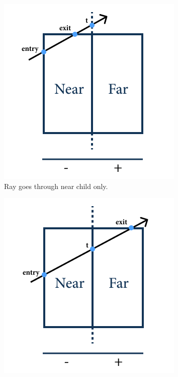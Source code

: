 \documentclass[a4paper,11pt,oneside]{article}
\begin{document}
\begin{figure}[ht]
     \centering
     \begin{subfigure}[b]{0.3\textwidth}
         \centering
         \includegraphics[width=\textwidth]{section4/4.3/near-intersection.png}
         \caption{Ray goes through near child only.}
         \label{sec4.3:near-child}
     \end{subfigure}
     \hfill
     \begin{subfigure}[b]{0.3\textwidth}
         \centering
         \includegraphics[width=\textwidth]{section4/4.3/middle-intersection.png}

\end{subfigure}
\end{figure}
\end{document}
